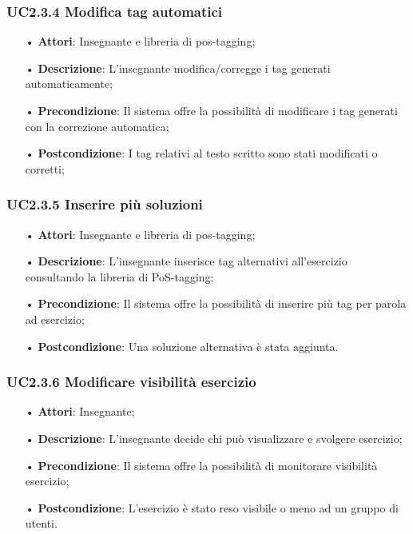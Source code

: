 \subsubsection{UC2.3.4	Modifica tag automatici}
\begin{itemize}
	\item[•] \textbf{Attori}: Insegnante e libreria di pos-tagging;
	\item[•] \textbf{Descrizione}: L’insegnante modifica/corregge i tag generati automaticamente;
	\item[•] \textbf{Precondizione}: Il sistema offre la possibilità di modificare i tag generati con la correzione automatica;
	\item[•] \textbf{Postcondizione}: I tag relativi al testo scritto sono stati modificati o corretti;
\end{itemize}

\subsubsection{UC2.3.5	Inserire più soluzioni}
\begin{itemize}
	\item[•] \textbf{Attori}: Insegnante e libreria di pos-tagging;
	\item[•] \textbf{Descrizione}: L'insegnante inserisce tag alternativi all’esercizio consultando la libreria di PoS-tagging;
	\item[•] \textbf{Precondizione}: Il sistema offre la possibilità di inserire più tag per parola ad 
			esercizio;
	\item[•] \textbf{Postcondizione}: Una soluzione alternativa è stata aggiunta.
\end{itemize}

\subsubsection{UC2.3.6	Modificare visibilità esercizio}
\begin{itemize}
	\item[•] \textbf{Attori}: Insegnante;
	\item[•] \textbf{Descrizione}: L'insegnante decide chi può visualizzare e svolgere esercizio;
	\item[•] \textbf{Precondizione}: Il sistema offre la possibilità di monitorare visibilità esercizio;
	\item[•] \textbf{Postcondizione}: L’esercizio è stato reso visibile o meno ad un gruppo di utenti.
\end{itemize}

